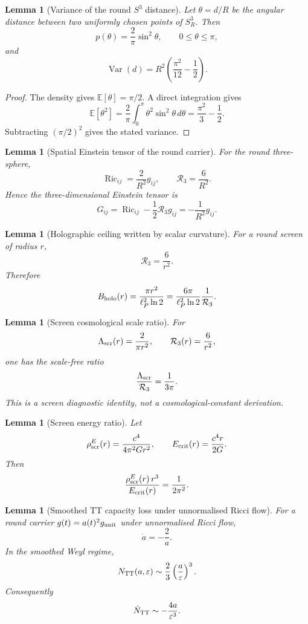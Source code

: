\documentclass[11pt,a4paper]{article}
\newtheorem{lemma}[theorem]{Lemma}
\begin{document}
\begin{lemma}[Variance of the round \(S^3\) distance]
Let \(\theta=d/R\) be the angular distance between two uniformly chosen points of \(S^3_R\).  Then
\[
p(\theta)=\frac{2}{\pi}\sin^2\theta,
\qquad
0\le\theta\le\pi,
\]
and
\[
\operatorname{Var}(d)
=
R^2\left(\frac{\pi^2}{12}-\frac12\right).
\]
\end{lemma}
\begin{proof}
The density gives \(\mathbb E[\theta]=\pi/2\).  A direct integration gives
\[
\mathbb E[\theta^2]
=
\frac{2}{\pi}\int_0^\pi \theta^2\sin^2\theta\,d\theta
=
\frac{\pi^2}{3}-\frac12.
\]
Subtracting \((\pi/2)^2\) gives the stated variance.
\end{proof}

\begin{lemma}[Spatial Einstein tensor of the round carrier]
For the round three-sphere,
\[
\operatorname{Ric}_{ij}=\frac{2}{R^2}g_{ij},
\qquad
\mathcal R_3=\frac{6}{R^2}.
\]
Hence the three-dimensional Einstein tensor is
\[
G_{ij}
=
\operatorname{Ric}_{ij}-\frac12\mathcal R_3g_{ij}
=
-\frac1{R^2}g_{ij}.
\]
\end{lemma}

\begin{lemma}[Holographic ceiling written by scalar curvature]
For a round screen of radius \(r\),
\[
\mathcal R_3=\frac6{r^2}.
\]
Therefore
\[
B_{\rm holo}(r)
=
\frac{\pi r^2}{\ell_P^2\ln2}
=
\frac{6\pi}{\ell_P^2\ln2}\frac1{\mathcal R_3}.
\]
\end{lemma}

\begin{lemma}[Screen cosmological scale ratio]
For
\[
\Lambda_{\rm scr}(r)=\frac{2}{\pi r^2},
\qquad
\mathcal R_3(r)=\frac6{r^2},
\]
one has the scale-free ratio
\[
\frac{\Lambda_{\rm scr}}{\mathcal R_3}
=
\frac1{3\pi}.
\]
This is a screen diagnostic identity, not a cosmological-constant derivation.
\end{lemma}

\begin{lemma}[Screen energy ratio]
Let
\[
\rho_{\rm scr}^E(r)=\frac{c^4}{4\pi^2G r^2},
\qquad
E_{\rm crit}(r)=\frac{c^4r}{2G}.
\]
Then
\[
\frac{\rho_{\rm scr}^E(r)\,r^3}{E_{\rm crit}(r)}
=
\frac1{2\pi^2}.
\]
\end{lemma}

\begin{lemma}[Smoothed TT capacity loss under unnormalised Ricci flow]
For a round carrier \(g(t)=a(t)^2g_{\rm unit}\) under unnormalised Ricci flow,
\[
\dot a=-\frac2a.
\]
In the smoothed Weyl regime,
\[
N_{\rm TT}(a,\varepsilon)\sim\frac23\left(\frac{a}{\varepsilon}\right)^3.
\]
Consequently
\[
\dot N_{\rm TT}
\sim
-\frac{4a}{\varepsilon^3}.
\]
\end{lemma}
\end{document}

